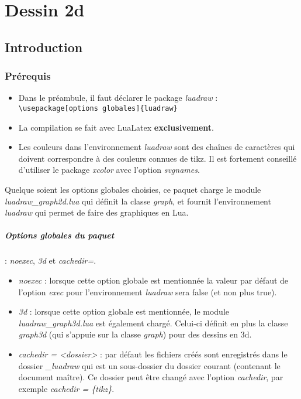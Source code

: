 \chapter{Dessin 2d}

\begin{center}
%
\par
{}
\end{center}

\section{Introduction}

\subsection{Prérequis}

\begin{itemize}
\item Dans le préambule, il faut déclarer le package \emph{luadraw} : \verb|\usepackage[options globales]{luadraw}|
\item La compilation se fait avec LuaLatex \textbf{exclusivement}.
\item Les couleurs dans l'environnement \emph{luadraw} sont des chaînes de caractères qui doivent correspondre à des couleurs connues de tikz. Il est fortement conseillé d'utiliser le package \emph{xcolor} avec l'option \emph{svgnames}.
\end{itemize}

Quelque soient les options globales choisies, ce paquet charge le module \emph{luadraw\_graph2d.lua} qui définit la classe \emph{graph}, et fournit l'environnement \emph{luadraw} qui permet de faire des graphiques en Lua.

\paragraph{Options globales du paquet} : \emph{noexec}, \emph{3d} et \emph{cachedir=}.

\begin{itemize}
    \item \emph{noexec} : lorsque cette option globale est mentionnée la valeur par défaut de l'option \emph{exec} pour l'environnement \emph{luadraw} sera false (et non plus true).
    \item \emph{3d} : lorsque cette option globale est mentionnée, le module \emph{luadraw\_graph3d.lua} est également chargé. Celui-ci définit en plus la classe \emph{graph3d} (qui s'appuie sur la classe \emph{graph}) pour des dessins en 3d. 
    \item \emph{cachedir = <dossier>} : par défaut les fichiers créés sont enregistrés dans le dossier \emph{\_luadraw} qui est un sous-dossier du dossier courant (contenant le document maître). Ce dossier peut être changé avec l'option \emph{cachedir}, par exemple \emph{cachedir = \{tikz\}}.
\end{itemize}


